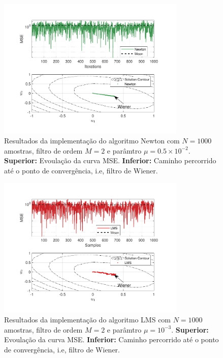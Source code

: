 \begin{figure}[!htp]
    \centering
    \includegraphics[width=0.80\textwidth]{fig/hw3p4-newton.pdf}
    \caption{Resultados da implementação do algoritmo Newton com $N = 1000$ amostras, filtro de ordem $M = 2$ e parâmtro $\mu = 0.5 \times 10^{-2}$. \textbf{Superior:} Evoulação da curva MSE. \textbf{Inferior:} Caminho percorrido até o ponto de convergência, i.e, filtro de Wiener.}
    \label{fig:hw3p4-newton}
\end{figure}

\begin{figure}[!htp]
    \centering
    \includegraphics[width=0.80\textwidth]{fig/hw3p4-lms.pdf}
    \caption{Resultados da implementação do algoritmo LMS com $N = 1000$ amostras, filtro de ordem $M = 2$ e parâmtro $\mu = 10^{-3}$. \textbf{Superior:} Evoulação da curva MSE. \textbf{Inferior:} Caminho percorrido até o ponto de convergência, i.e, filtro de Wiener.}
    \label{fig:hw3p4-lms}
\end{figure}

